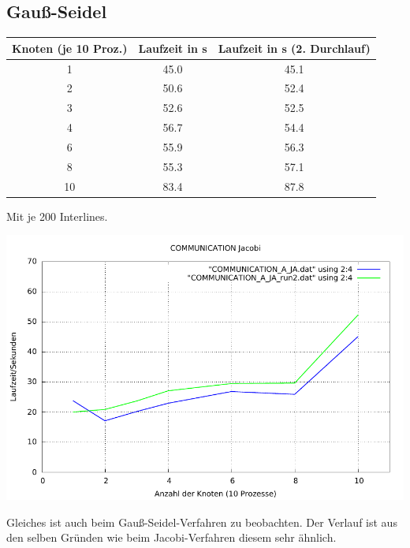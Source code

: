 \documentclass[a4paper]{article}
\begin{document}
\subsection{Gauß-Seidel}
\begin{tabular}{|c|c|c|}
\hline 
Knoten (je 10 Proz.) & Laufzeit in s & Laufzeit in s (2. Durchlauf) \\ 
\hline 
1 & 45.0 & 45.1 \\ 
\hline 
2 & 50.6 & 52.4 \\ 
\hline 
3 & 52.6 & 52.5 \\ 
\hline 
4 & 56.7 & 54.4 \\ 
\hline 
6 & 55.9 & 56.3 \\ 
\hline 
8 & 55.3 & 57.1 \\ 
\hline 
10 & 83.4 & 87.8 \\ 
\hline 
\end{tabular} 

Mit je 200 Interlines.

\includegraphics[scale=0.8]{img/COMMUNICATION_JA_laufzeit.pdf}

Gleiches ist auch beim Gauß-Seidel-Verfahren zu beobachten. Der Verlauf ist aus den selben Gründen wie beim Jacobi-Verfahren diesem sehr ähnlich. 
\end{document}

